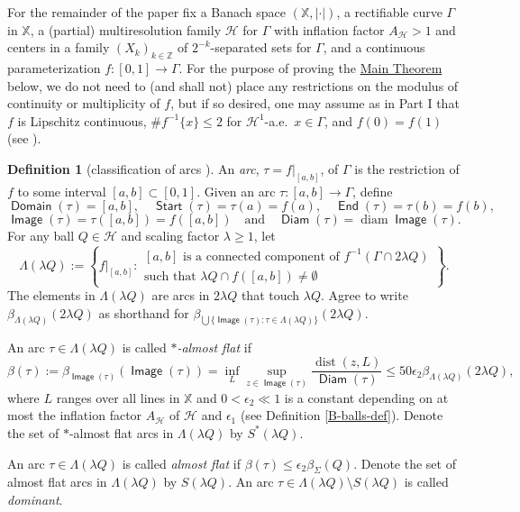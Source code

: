 \documentclass[12pt]{amsart}
\numberwithin{equation}{section}
\theoremstyle{plain}
\theoremstyle{definition}
\newtheorem{definition}[theorem]{Definition}
\def\ZZ{\mathbb{Z}}
\def\XX{{\mathbb{X}}}
\newcommand{\diam}{\mathop\mathrm{diam}\nolimits}
\newcommand{\dist}{\mathop\mathrm{dist}\nolimits}
\newcommand{\Haus}{\mathcal{H}}
\newcommand{\Start}{\mathop\mathsf{Start}\nolimits}
\newcommand{\End}{\mathop\mathsf{End}\nolimits}
\newcommand{\Domain}{\mathop\mathsf{Domain}\nolimits}
\newcommand{\Image}{\mathop\mathsf{Image}\nolimits}
\newcommand{\Diam}{\mathop\mathsf{Diam}\nolimits}
\newcommand{\flatepsilon}{\epsilon_2}
\numberwithin{figure}{section}
\begin{document}
For the remainder of the paper fix a Banach space $(\XX,|\cdot|)$, a rectifiable curve $\Gamma$ in $\XX$, a (partial) multiresolution family $\mathscr{H}$ for $\Gamma$ with inflation factor $A_\mathscr{H}>1$ and centers in a family $(X_k)_{k\in\ZZ}$ of $2^{-k}$-separated sets for $\Gamma$, and a continuous parameterization $f:[0,1]\rightarrow\Gamma$. For the purpose of proving the \hyperref[t:main]{Main Theorem} below, we do not need to (and shall not) place any restrictions on the modulus of continuity or multiplicity of $f$, but if so desired, one may assume as in Part I that $f$ is Lipschitz continuous, $\#f^{-1}\{x\}\leq 2$ for $\Haus^1$-a.e.~$x\in\Gamma$, and $f(0)=f(1)$ (see \cite{AO-curves}).

\begin{definition}[classification of arcs {\cite{Badger-McCurdy-1}}] \label{def:arcs} An \emph{arc}, $\tau=f|_{[a,b]}$, of $\Gamma$ is the restriction of $f$ to some interval $[a,b]\subset[0,1]$. Given an arc $\tau:[a,b]\rightarrow\Gamma$, define $$\Domain(\tau)=[a,b],\quad \Start(\tau)=\tau(a)=f(a),\quad\End(\tau)=\tau(b)=f(b),$$ $$\Image(\tau)=\tau([a,b])=f([a,b])\quad\text{and}\quad \Diam(\tau)=\diam\Image(\tau).$$
For any ball $Q\in\mathscr{H}$ and scaling factor $\lambda\geq 1$, let \begin{equation}\Lambda(\lambda Q):=\left\{f|_{[a,b]}:\begin{array}{c}[a,b]\text{ is a connected component of }f^{-1}(\Gamma\cap 2\lambda Q)\\ \text{such that }\lambda Q\cap f([a,b])\neq\emptyset\end{array}\right\}.\end{equation} The elements in $\Lambda(\lambda Q)$ are arcs in $2\lambda Q$ that touch $\lambda Q$. Agree to write $\beta_{\Lambda(\lambda Q)}(2\lambda Q)$ as shorthand for $\beta_{\bigcup\{\Image(\tau):\tau\in\Lambda(\lambda Q)\}}(2\lambda Q)$.

An arc $\tau\in\Lambda(\lambda Q)$ is called \emph{$*$-almost flat} if \begin{equation}\label{e:star-flat} \beta(\tau):=\beta_{\Image(\tau)}(\Image(\tau))= \inf_{L}\sup_{z\in\Image(\tau)} \frac{\dist(z,L)}{\Diam(\tau)} \leq 50\flatepsilon \beta_{\Lambda(\lambda Q)}(2\lambda Q),\end{equation} where $L$ ranges over all lines in $\XX$ and $0<\flatepsilon\ll 1$ is a constant depending on at most the inflation factor $A_\mathscr{H}$ of $\mathscr{H}$ and $\epsilon_1$ (see Definition \ref{B-balls-def}). Denote the set of $*$-almost flat arcs in $\Lambda(\lambda Q)$ by $S^*(\lambda Q)$.

An arc $\tau\in\Lambda(\lambda Q)$ is called \emph{almost flat} if $\beta(\tau)\leq \flatepsilon \beta_{\Sigma}(Q).$ Denote the set of almost flat arcs in $\Lambda(\lambda Q)$ by $S(\lambda Q)$. An arc $\tau\in\Lambda(\lambda Q)\setminus S(\lambda Q)$ is called \emph{dominant}.\label{dom-arcs}%
\end{definition}
\end{document}
